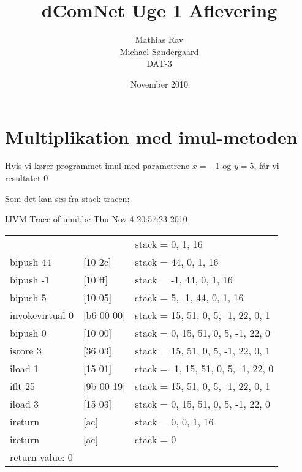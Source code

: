 \documentclass[12pt,a4paper]{article}
\begin{document}
\title{dComNet Uge 1 Aflevering}
\author{Mathias Rav \\
		Michael Søndergaard \\
		DAT-3}
\date{November 2010}
\maketitle

\section{Multiplikation med imul-metoden}
Hvis vi kører programmet imul med parametrene $x=-1$ og $y=5$, får vi resultatet $0$

Som det kan ses fra stack-tracen:

IJVM Trace of imul.bc Thu Nov  4 20:57:23 2010

\begin{tabular}{lll}
                  &           & stack = 0, 1, 16 \\
bipush 44         & [10 2c]   & stack = 44, 0, 1, 16 \\
bipush -1         & [10 ff]   & stack = -1, 44, 0, 1, 16 \\
bipush 5          & [10 05]   & stack = 5, -1, 44, 0, 1, 16 \\
invokevirtual 0   & [b6 00 00]& stack = 15, 51, 0, 5, -1, 22, 0, 1 \\
bipush 0          & [10 00]   & stack = 0, 15, 51, 0, 5, -1, 22, 0 \\
istore 3          & [36 03]   & stack = 15, 51, 0, 5, -1, 22, 0, 1 \\
iload 1           & [15 01]   & stack = -1, 15, 51, 0, 5, -1, 22, 0 \\
iflt 25           & [9b 00 19]& stack = 15, 51, 0, 5, -1, 22, 0, 1 \\
iload 3           & [15 03]   & stack = 0, 15, 51, 0, 5, -1, 22, 0 \\
ireturn           & [ac]      & stack = 0, 0, 1, 16 \\
ireturn           & [ac]      & stack = 0 \\
return value: 0
\end{tabular}
\end{document}
